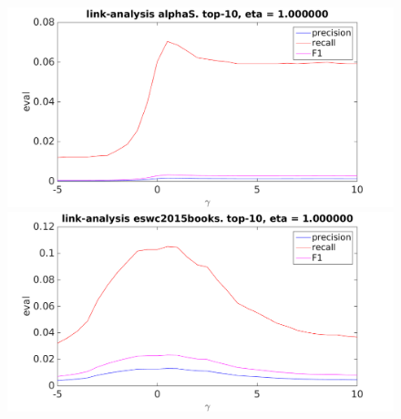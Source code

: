 \FloatBarrier

\begin{figure}[h!]
\centering
\begin{minipage}{.5\textwidth}
    \centering
    \includegraphics[width=\linewidth]{fig/link_gamma/alphaS_link_gamma.png}
\end{minipage}%
\begin{minipage}{.5\textwidth}
    \centering
    \includegraphics[width=\linewidth]{fig/link_gamma/eswc2015books_link_gamma.png}
\end{minipage}
\end{figure}

